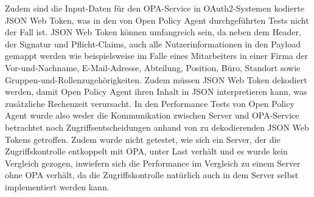 Zudem sind die Input-Daten für den OPA-Service in OAuth2-Systemen kodierte JSON Web Token, was in den von Open Policy Agent durchgeführten Tests nicht der Fall ist. JSON Web Token können umfangreich sein, da neben dem Header, der Signatur und Pflicht-Claims, auch alle Nutzerinformationen in den Payload gemappt werden wie beispielsweise im Falle eines Mitarbeiters in einer Firma der Vor-und-Nachname, E-Mail-Adresse, Abteilung, Position, Büro, Standort sowie Gruppen-und-Rollenzugehörigkeiten. Zudem müssen JSON Web Token dekodiert werden, damit Open Policy Agent ihren Inhalt in JSON interpretieren kann, was zusätzliche Rechenzeit verursacht. 
In den Performance Tests von Open Policy Agent wurde also weder die Kommunikation zwischen Server und OPA-Service betrachtet noch Zugriffsentscheidungen anhand von zu dekodierenden JSON Web Tokens getroffen. Zudem wurde nicht getestet, wie sich ein Server, der die Zugriffskontrolle entkoppelt mit OPA, unter Last verhält und es wurde kein Vergleich gezogen, inwiefern sich die Performance im Vergleich zu einem Server ohne OPA verhält, da die Zugriffskontrolle natürlich auch in dem Server selbst implementiert werden kann. 

